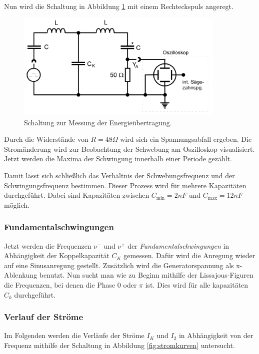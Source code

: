 Nun wird die Schaltung in Abbildung \ref{fig:schwebeschaltung} mit einem Rechteckspuls angeregt.

\begin{figure} 
    \centering
    \includegraphics[width=10cm] {pictures/schwebeschaltung.png} 
    \caption{Schaltung zur Messung der Energieübertragung. \cite{v355}}
    \label{fig:schwebeschaltung}
\end{figure} 

Durch die Widerstände von $R = 48 \Omega$ wird sich ein Spannungsabfall ergeben.
Die Stromänderung wird zur Beobachtung der Schwebung am Oszilloskop visualisiert.
Jetzt werden die Maxima der Schwingung innerhalb einer Periode gezählt.

Damit lässt sich schließlich das Verhältnis der Schwebungsfrequenz und der Schwingungsfrequenz bestimmen.
Dieser Prozess wird für mehrere Kapazitäten durchgeführt.
Dabei sind Kapazitäten zwischen $C_{\text{min}} = 2 nF$ und $C_{\text{max}} = 12 nF$ möglich.


\subsubsection*{Fundamentalschwingungen}

Jetzt werden die Frequenzen $\nu^{-}$ und $\nu^{+}$ der \textit{Fundamentalschwingungen} in 
Abhängigkeit der Koppelkapazität $C_{K}$ gemessen.
Dafür wird die Anregung wieder auf eine Sinusanregung gestellt.
Zusätzlich wird die Generatorspannung als x-Ablenkung benutzt.
Nun sucht man wie zu Beginn mithilfe der Lissajous-Figuren die Frequenzen, bei denen die Phase 0 oder $\pi$ ist.
Dies wird für alle kapazitäten $C_{k}$ durchgeführt.


\subsubsection*{Verlauf der Ströme}

Im Folgenden werden die Verläufe der Ströme $I_{K}$ und $I_{2}$ in Abhängigkeit von der Frequenz
mithilfe der Schaltung in Abbildung \ref{fig:stromkurven} untersucht.

